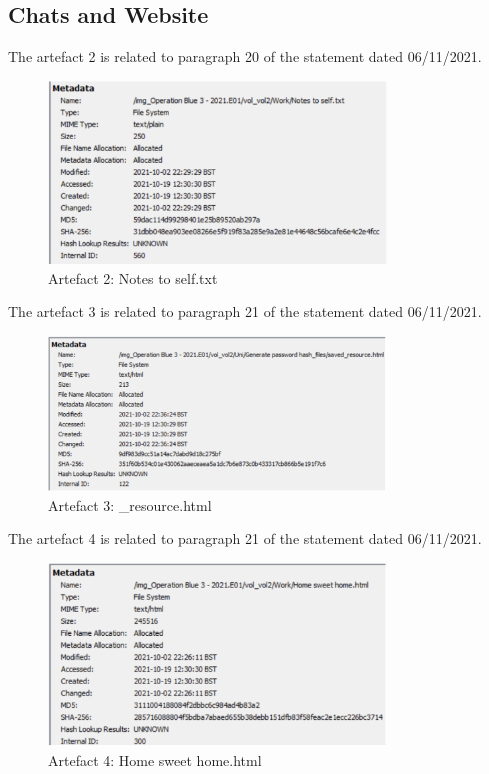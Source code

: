 \subsection{Chats and Website}
\label{s:evidential-extraction-document-chats}
The artefact 2 is related to paragraph 20 of the statement dated 06/11/2021.
\begin{figure}[H]
  \centering
  \includegraphics[width=0.8\textwidth]{figures/meta2}
  \caption{Artefact 2: Notes to self.txt}
  \label{f:meta2}
\end{figure}
\newpage
The artefact 3 is related to paragraph 21 of the statement dated 06/11/2021.
\begin{figure}[H]
  \centering
  \includegraphics[width=0.8\textwidth]{figures/meta3}
  \caption{Artefact 3: \_resource.html}
  \label{f:meta3}
\end{figure}
The artefact 4 is related to paragraph 21 of the statement dated 06/11/2021.
\begin{figure}[H]
  \centering
  \includegraphics[width=0.8\textwidth]{figures/meta4}
  \caption{Artefact 4: Home sweet home.html}
  \label{f:meta4}
\end{figure}
